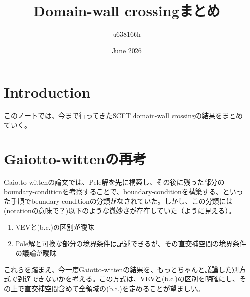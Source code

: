 \documentclass[dvipdfmx,a4paper,10.5pt]{article}
\title{Domain-wall crossingまとめ}
\author{u638166h }
\date{June 2026}
\numberwithin{equation}{section}
\begin{document}
\maketitle

\section{Introduction}
このノートでは、今まで行ってきたSCFT domain-wall crossingの結果をまとめていく。


\section{Gaiotto-wittenの再考}
Gaiotto-wittenの論文では、Pole解を先に構築し、その後に残った部分のboundary-conditionを考察することで、boundary-conditionを構築する、といった手順でboundary-conditionの分類がなされていた。しかし、この分類には(notationの意味で？)以下のような微妙さが存在していた（ように見える）。
\begin{enumerate}
    \item VEVと(b.c.)の区別が曖昧
    \item Pole解と可換な部分の境界条件は記述できるが、その直交補空間の境界条件の議論が曖昧
\end{enumerate}
これらを踏まえ、今一度Gaiotto-wittenの結果を、もっとちゃんと議論した別方式で到達できないかを考える。この方式は、VEVと(b.c.)の区別を明確にし、その上で直交補空間含めて全領域の(b.c.)を定めることが望ましい。\\
\end{document}
